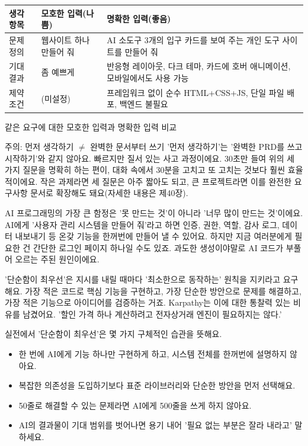 \begin{center}
\begin{tabularx}{\linewidth}{|X|X|X|}
\hline
\textbf{생각 항목} & \textbf{모호한 입력(나쁨)} & \textbf{명확한 입력(좋음)} \tabularnewline
\hline
문제 정의 & 웹사이트 하나 만들어 줘 & AI 소도구 3개의 입구 카드를 보여 주는 개인 도구 사이트를 만들어 줘 \tabularnewline
기대 결과 & 좀 예쁘게 & 반응형 레이아웃, 다크 테마, 카드에 호버 애니메이션, 모바일에서도 사용 가능 \tabularnewline
제약 조건 & (미설정) & 프레임워크 없이 순수 HTML+CSS+JS, 단일 파일 배포, 백엔드 불필요 \tabularnewline
\hline
\end{tabularx}
\end{center}

\begin{center}\small\color{gray}같은 요구에 대한 모호한 입력과 명확한 입력 비교\end{center}

\begin{tcbwarn}{주의: 먼저 생각하기 $\neq$ 완벽한 문서부터 쓰기}
'먼저 생각하기'는 '완벽한 PRD를 쓰고 시작하기'와 같지 않아요. 빠르지만 질서 있는 사고 과정이에요. 30초만 들여 위의 세 가지 질문을 명확히 하는 편이, 대화 속에서 30분을 고치고 또 고치는 것보다 훨씬 효율적이에요. 작은 과제라면 세 질문은 아주 짧아도 되고, 큰 프로젝트라면 이를 완전한 요구사항 문서로 확장해도 돼요(자세한 내용은 제40장).

\end{tcbwarn}


AI 프로그래밍의 가장 큰 함정은 '못 만드는 것'이 아니라 '너무 많이 만드는 것'이에요. AI에게 '사용자 관리 시스템을 만들어 줘'라고 하면 인증, 권한, 역할, 감사 로그, 데이터 내보내기 등 온갖 기능을 한꺼번에 만들어 낼 수 있어요. 하지만 지금 여러분에게 필요한 건 간단한 로그인 페이지 하나일 수도 있죠. 과도한 생성이야말로 AI 코드가 부풀어 오르는 주된 원인이에요.

'단순함이 최우선'은 지시를 내릴 때마다 '최소한으로 동작하는' 원칙을 지키라고 요구해요. 가장 적은 코드로 핵심 기능을 구현하고, 가장 단순한 방안으로 문제를 해결하고, 가장 적은 기능으로 아이디어를 검증하는 거죠. Karpathy는 이에 대한 통찰력 있는 비유를 남겼어요. '할인 가격 하나 계산하려고 전자상거래 엔진이 필요하지는 않다.'

실전에서 '단순함이 최우선'은 몇 가지 구체적인 습관을 뜻해요.

\begin{itemize}
  \item 한 번에 AI에게 기능 하나만 구현하게 하고, 시스템 전체를 한꺼번에 설명하지 않아요.
  \item 복잡한 의존성을 도입하기보다 표준 라이브러리와 단순한 방안을 먼저 선택해요.
  \item 50줄로 해결할 수 있는 문제라면 AI에게 500줄을 쓰게 하지 않아요.
  \item AI의 결과물이 기대 범위를 벗어나면 용기 내어 '필요 없는 부분은 잘라 내라고' 말하세요.
\end{itemize}

